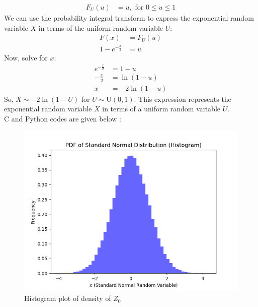 \documentclass[article]{IEEEtran}
\theoremstyle{remark}
\begin{document}
\begin{align}
F_U(u) &= u, \text{ for } 0 \leq u \leq 1
\end{align}
We can use the probability integral transform to express the exponential random variable $X$ in terms of the uniform random variable $U$:
\begin{align}
F(x) &= F_U(u) \\
1 - e^{-\frac{x}{2}} &= u
\end{align}
Now, solve for $x$:
\begin{align}
e^{-\frac{x}{2}} &= 1 - u \\
-\frac{x}{2} &= \ln(1 - u) \\
x &= -2 \ln(1 - u)
\end{align}
So, $X \sim -2 \ln(1 - U)$ for $U \sim \text{U}(0, 1)$. This expression represents the exponential random variable $X$ in terms of a uniform random variable $U$.\\
C and Python codes are given below :
  
  
\begin{figure}[!ht]
  \centering
  \includegraphics[width=\columnwidth]{2023/ST/15/figs/figure1.png}  %
  \caption{Histogram plot of density of $Z_0$}
\end{figure}
\end{document}

